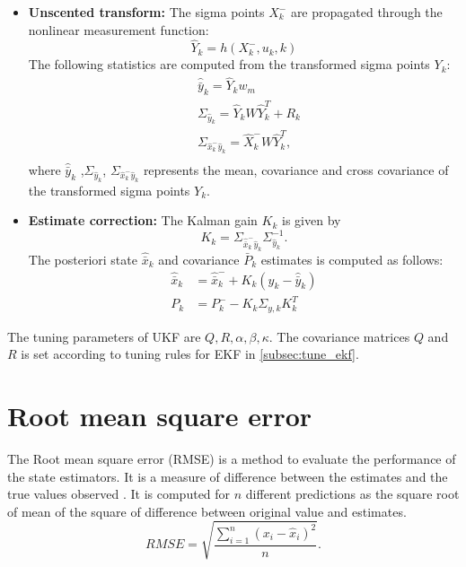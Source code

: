\begin{itemize}
\begin{itemize}
        \item \textbf{Unscented transform:} The sigma points $X_k^-$ are propagated through the nonlinear measurement function:
        \begin{equation}
        \hat Y_k = h(X_{k}^-,u_k,k) 
        \end{equation}
        The following statistics are computed from the transformed sigma points $Y_k$:
        \begin{equation}
        \begin{split}
        &\hat{\bar y}_k = \hat Y_k w_m \\
        &\Sigma_{\hat y_k} = \hat Y_k W \hat Y_k^T + R_k \\
        &\Sigma_{\hat x_k^- \hat y_k} = \hat X_k^- W \hat Y_k^T, \\
        \end{split}
        \end{equation}
		where $\hat{\bar y}_k$ ,$\Sigma_{\hat y_k}$, $\Sigma_{\hat x_k^- \hat y_k}$ represents the mean, covariance and cross covariance of the transformed sigma points $Y_k$. 
		\item \textbf{Estimate correction:}	The Kalman gain $K_k$ is given by
  	\begin{equation}
  		 K_k = \Sigma_{\hat{\bar x}_k^- \hat y_k} \Sigma_{\hat y_k}^{-1}.
  	\end{equation}
  	The posteriori state $\hat{\bar x}_k$ and covariance ${\bar P}_k$ estimates is computed as follows:
        \begin{equation}
        \begin{split}       
        \hat{\bar{x}}_k &= \hat{\bar{x}}_k^- + K_k(y_k - \hat{\bar y}_k)\\
        P_k &= P_k^- - K_k \Sigma_{y,k} K_k^T
        \end{split}
        \end{equation}
    \end{itemize}
\end{itemize}

The tuning parameters of UKF are $Q,R,\alpha,\beta,\kappa$. The covariance matrices $Q$ and $R$ is set according to tuning rules for EKF in \ref{subsec:tune_ekf}.
\section{Root mean square error}
The Root mean square error (RMSE) is a method to evaluate the performance of the state estimators. It is a measure of difference between the estimates and the true values observed \citep{hyn06}. It is computed for $n$ different predictions as the square root of mean of the square of difference between original value and estimates.
\begin{equation}
    \label{eq:rmse}
    RMSE = \sqrt{\frac{\sum_{i=1}^n (x_i - \hat x_i)^2}{n}}.
\end{equation}

